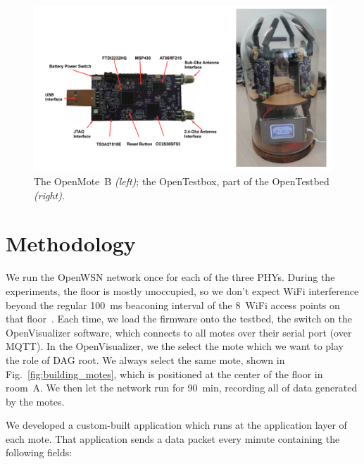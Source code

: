 \documentclass[sensors,article,submit,moreauthors,pdftex]{Definitions/mdpi}
\begin{document}
\begin{figure}
	\centering
	\includegraphics[width=0.90\columnwidth]{mote_ot}
	\caption{
	    The OpenMote~B \textit{(left)}; the OpenTestbox, part of the OpenTestbed \textit{(right)}.
	}
    \label{fig:mote_ot}
\end{figure}

\section{Methodology}
\label{sec:methodology}


We run the OpenWSN network once for each of the three PHYs.
During the experiments, the floor is mostly unoccupied, so we don't expect WiFi interference beyond the regular 100~ms beaconing interval of the 8~WiFi access points on that floor~\cite{munoz18overview}.
Each time, we load the firmware onto the testbed, the switch on the OpenVisualizer software, which connects to all motes over their serial port (over MQTT).
In the OpenVisualizer, we the select the mote which we want to play the role of DAG root.
We always select the same mote, shown in Fig.~\ref{fig:building_motes}, which is positioned at the center of the floor in room~A.
We then let the network run for 90~min, recording all of data generated by the motes.


We developed a custom-built application which runs at the application layer of each mote.
That application sends a data packet every minute containing the following fields:
\end{document}
